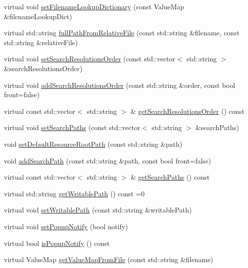 \begin{DoxyCompactItemize}
\item 
virtual void \hyperlink{classFileUtils_a9b5b9626c0c291f58e384bfc53949c97}{set\+Filename\+Lookup\+Dictionary} (const Value\+Map \&filename\+Lookup\+Dict)
\item 
virtual std\+::string \hyperlink{classFileUtils_a632933377d6c84ec2687587883e2c419}{full\+Path\+From\+Relative\+File} (const std\+::string \&filename, const std\+::string \&relative\+File)
\item 
virtual void \hyperlink{classFileUtils_ac99445fa3112510c8f019c9f38a4779f}{set\+Search\+Resolutions\+Order} (const std\+::vector$<$ std\+::string $>$ \&search\+Resolutions\+Order)
\item 
virtual void \hyperlink{classFileUtils_a06551ef2a3f73686052fa91203d2a219}{add\+Search\+Resolutions\+Order} (const std\+::string \&order, const bool front=false)
\item 
virtual const std\+::vector$<$ std\+::string $>$ \& \hyperlink{classFileUtils_a079329ce5d4a0154fed6a3987d42dc26}{get\+Search\+Resolutions\+Order} () const
\item 
virtual void \hyperlink{classFileUtils_a70336b604a6a9eb20dc56db8e8581a3d}{set\+Search\+Paths} (const std\+::vector$<$ std\+::string $>$ \&search\+Paths)
\item 
void \hyperlink{classFileUtils_a286cf8c14b4bf393e492ba0e3411ec06}{set\+Default\+Resource\+Root\+Path} (const std\+::string \&path)
\item 
void \hyperlink{classFileUtils_a690dab9554f2976e2d5ae0a6322e245d}{add\+Search\+Path} (const std\+::string \&path, const bool front=false)
\item 
virtual const std\+::vector$<$ std\+::string $>$ \& \hyperlink{classFileUtils_a4e21f0076f5183637e1c0d273bd7d0ce}{get\+Search\+Paths} () const
\item 
virtual std\+::string \hyperlink{classFileUtils_aab14c8d4e292f7a1e9b2b2908d02a0ed}{get\+Writable\+Path} () const =0
\item 
virtual void \hyperlink{classFileUtils_ac8241b72075065d1d23581761e051b75}{set\+Writable\+Path} (const std\+::string \&writable\+Path)
\item 
virtual void \hyperlink{classFileUtils_abf036eb8785edfb8077c2d92444d55a4}{set\+Popup\+Notify} (bool notify)
\item 
virtual bool \hyperlink{classFileUtils_acf344799ae42662fd4371b44ecaac739}{is\+Popup\+Notify} () const
\item 
virtual Value\+Map \hyperlink{classFileUtils_a67aa84a7b5bcfb46a646260c084ad829}{get\+Value\+Map\+From\+File} (const std\+::string \&filename)

\end{DoxyCompactItemize}
